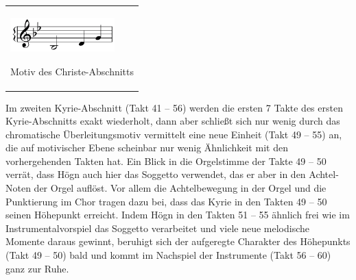 \begin{center}
\begin{minipage}{4.394cm}
\begin{flushleft}
\tablefirsthead{}
\tablehead{}
\tabletail{}
\tablelasttail{}
\begin{supertabular}{m{4.1940002cm}}

\includegraphics[width=4.011cm,height=1.378cm]{pictures/zulassungsarbeit-img119.png}
\begin{figure}
\img{}
\caption{}
\end{figure}
Motiv des Christe-Abschnitts\\
\end{supertabular}
\end{flushleft}
\end{minipage}
\end{center}
Im zweiten Kyrie-Abschnitt (Takt 41 – 56) werden die ersten 7 Takte des
ersten Kyrie-Abschnitts exakt wiederholt, dann aber schließt sich nur
wenig durch das chromatische Überleitungsmotiv vermittelt eine neue
Einheit (Takt 49 – 55) an, die auf motivischer Ebene scheinbar nur
wenig Ähnlichkeit mit den vorhergehenden Takten hat. Ein Blick in die
Orgelstimme der Takte 49 – 50 verrät, dass Högn auch hier das Soggetto
verwendet, das er aber in den Achtel-Noten der Orgel auflöst. Vor allem
die Achtelbewegung in der Orgel und die Punktierung im Chor tragen dazu
bei, dass das Kyrie in den Takten 49 – 50 seinen Höhepunkt erreicht.
Indem Högn in den Takten 51 – 55 ähnlich frei wie im
Instrumentalvorspiel das Soggetto verarbeitet und viele neue melodische
Momente daraus gewinnt, beruhigt sich der aufgeregte Charakter des
Höhepunkts (Takt 49 – 50) bald und kommt im Nachspiel der Instrumente
(Takt 56 – 60) ganz zur Ruhe.

